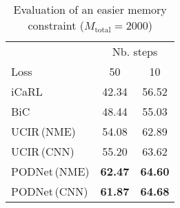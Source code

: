 \begin{table*}
    \centering
    \begin{tabular}{@{}l|cc@{}}
        \toprule
                                                      & \multicolumn{2}{c}{Nb. steps}                  \\
        \cmidrule{2-3}
        Loss                                          & 50                            & 10             \\
        \midrule
        iCaRL \cite{rebuffi2017icarl}                 & 42.34                         & 56.52          \\
        BiC \cite{wu2019bias_correction}              & 48.44                         & 55.03          \\
        UCIR\,{\scriptsize (NME)}\,\cite{hou2019ucir} & 54.08                         & 62.89          \\
        UCIR\,{\scriptsize (CNN)}\,                   & 55.20                         & 63.62          \\
        PODNet\,{\scriptsize (NME)}                   & \textbf{62.47}                & \textbf{64.60} \\
        PODNet\,{\scriptsize (CNN)}                   & \textbf{61.87}                & \textbf{64.68} \\
        \bottomrule
    \end{tabular}
    \caption{Evaluation of an easier memory constraint ($M_\mathrm{total} = 2000$)}
    \label{tab:podnet_sub_free_memory}
\end{table*}
